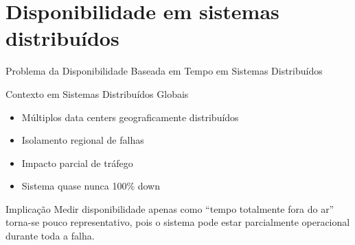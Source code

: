 \documentclass[9pt]{beamer}
\begin{document}
\section{Disponibilidade em sistemas distribuídos}

\begin{frame}{Problema da Disponibilidade Baseada em Tempo em Sistemas Distribuídos}

\begin{block}{Contexto em Sistemas Distribuídos Globais}

\begin{itemize}
    \item Múltiplos data centers geograficamente distribuídos
    \item Isolamento regional de falhas
    \item Impacto parcial de tráfego
    \item Sistema quase nunca 100\% down
\end{itemize}

\end{block}

\begin{alertblock}{Implicação}
Medir disponibilidade apenas como “tempo totalmente fora do ar”
torna-se pouco representativo, pois o sistema pode estar parcialmente
operacional durante toda a falha.
\end{alertblock}

\begin{center}
\end{center}

\end{frame} 
\end{document}
